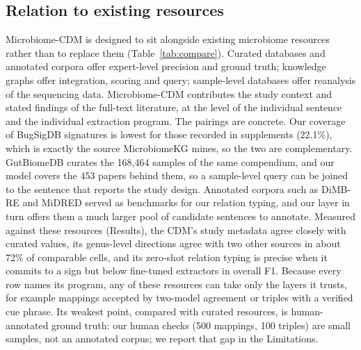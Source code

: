 \documentclass[referee,lineno,pdflatex,sn-vancouver-num]{sn-jnl}
\theoremstyle{thmstyleone}%
\theoremstyle{thmstyletwo}%
\theoremstyle{thmstylethree}%
\begin{document}
\subsection{Relation to existing resources}\label{sec:compare}
Microbiome-CDM is designed to sit alongside existing microbiome resources
rather than to replace them (Table~\ref{tab:compare}). Curated databases and
annotated corpora offer expert-level precision and ground truth;
knowledge graphs offer integration, scoring and query; sample-level databases
offer reanalysis of the sequencing data. Microbiome-CDM contributes the
study context and stated findings of the full-text literature, at the level
of the individual sentence and the individual extraction program. The pairings
are concrete. Our coverage of BugSigDB signatures is lowest for those recorded
in supplements (22.1\%), which is exactly the source MicrobiomeKG mines, so
the two are complementary. GutBiomeDB curates the 168,464 samples of the same
compendium, and our model covers the 453 papers behind them, so a sample-level
query can be joined to the sentence that reports the study design. Annotated corpora such as DiMB-RE and MiDRED served as benchmarks for our
relation typing, and our layer in turn offers them a much larger pool of
candidate sentences to annotate. Measured against these resources (Results),
the CDM's study metadata agree closely with curated values, its genus-level
directions agree with two other sources in about 72\% of comparable
cells, and its zero-shot relation typing is precise when it commits to a sign
but below fine-tuned extractors in overall F1.
Because every row names its program, any of these resources can take only the
layers it trusts, for example mappings accepted by two-model agreement or
triples with a verified cue phrase. Its weakest point, compared with curated
resources, is human-annotated ground truth: our human checks (500 mappings,
100 triples) are small samples, not an annotated corpus; we report that gap in
the Limitations.
\end{document}
